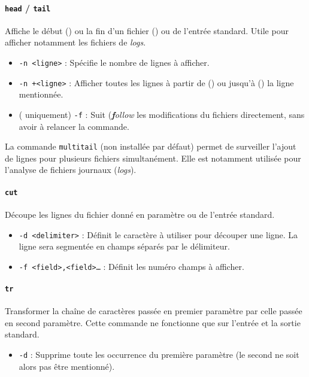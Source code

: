 \paragraph{\texttt{head} / \texttt{tail}} 
Affiche le début () ou la fin d'un fichier () ou de l'entrée standard. Utile pour afficher notamment les fichiers de \textit{logs}.
\begin{itemize}
    \item \texttt{-n <ligne>} : Spécifie le nombre de lignes à afficher.
    \item \texttt{-n +<ligne>} : Afficher toutes les lignes à partir de () ou jusqu'à () la ligne mentionnée.
    \item ( uniquement) \texttt{-f} : Suit (\textit{\textbf{f}ollow} les modifications du fichiers directement, sans avoir à relancer la commande.
\end{itemize}
 La commande \texttt{multitail} (non installée par défaut) permet de surveiller l'ajout de lignes pour plusieurs fichiers simultanément. Elle est notamment utilisée pour l'analyse de fichiers journaux (\textit{logs}).

\paragraph{\texttt{cut}} 
Découpe les lignes du fichier donné en paramètre ou de l'entrée standard. 
\begin{itemize}
    \item \texttt{-d <delimiter>} : Définit le caractère à utiliser pour découper une ligne. La ligne sera segmentée en champs séparés par le délimiteur.
    \item \texttt{-f <field>,<field>\dots} : Définit les numéro champs à afficher. 
\end{itemize}

\paragraph{\texttt{tr}} 
Transformer la chaîne de caractères passée en premier paramètre par celle passée en second paramètre. Cette commande ne fonctionne que sur l'entrée et la sortie standard.
\begin{itemize}
    \item \texttt{-d} : Supprime toute les occurrence du première paramètre (le second ne soit alors pas être mentionné).
\end{itemize}

